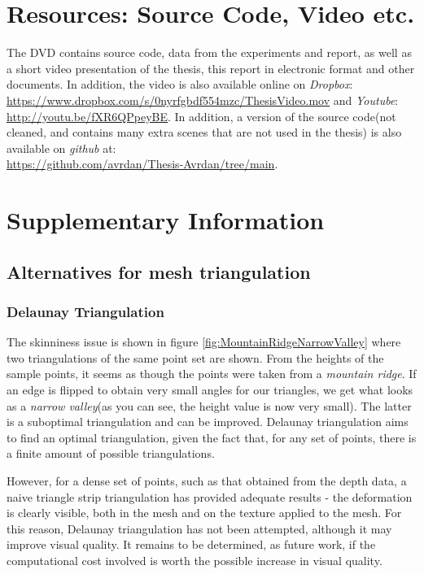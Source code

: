\documentclass[]{article}
\begin{document}
\begin{appendices}

\section{Resources: Source Code, Video etc.}
\label{appendix:A}

The DVD contains source code, data from the experiments and report, as well as a short video presentation of the thesis, this report in electronic format and other documents. In addition, the video is also available online on \textit{Dropbox}:\\ \url{https://www.dropbox.com/s/0nyrfgbdf554mzc/ThesisVideo.mov} and \textit{Youtube}:\\ \url{http://youtu.be/fXR6QPpeyBE}. In addition, a version of the source code(not cleaned, and contains many extra scenes that are not used in the thesis) is also available on \textit{github} at:\\ \url{https://github.com/avrdan/Thesis-Avrdan/tree/main}.

\clearpage{\pagestyle{empty}\cleardoublepage}


\section{Supplementary Information}
\label{appendix:B}
\subsection{Alternatives for mesh triangulation}

\subsubsection{Delaunay Triangulation}
\label{appendix:B-delaunay}
The skinniness issue is shown in figure \ref{fig:MountainRidgeNarrowValley} where two triangulations of the same point set are shown. From the heights of the sample points, it seems as though the points were taken from a \textit{mountain ridge}. If an edge is flipped to obtain very small angles for our triangles, we get what looks as a \textit{narrow valley}(as you can see, the height value is now very small). The latter is a suboptimal triangulation and can be improved. Delaunay triangulation aims to find an optimal triangulation, given the fact that, for any set of points, there is a finite amount of possible triangulations.

However, for a dense set of points, such as that obtained from the depth data, a naive triangle strip triangulation has provided adequate results - the deformation is clearly visible, both in the mesh and on the texture applied to the mesh. For this reason, Delaunay triangulation has not been attempted, although it may improve visual quality. It remains to be determined, as future work, if the computational cost involved is worth the possible increase in visual quality.


\end{appendices}
\end{document}
